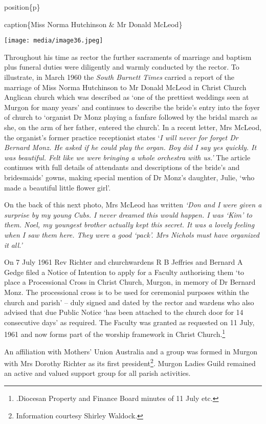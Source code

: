 position\{p\}

caption\{Miss Norma Hutchinson \& Mr Donald McLeod\}

\texttt{[image: media/image36.jpeg]}

Throughout his time as rector the further sacraments of marriage and baptism plus funeral duties were diligently and warmly conducted by the rector. To illustrate, in March 1960 the \emph{South Burnett Times} carried a report of the marriage of Miss Norma Hutchinson to Mr Donald McLeod in Christ Church Anglican church which was described as `one of the prettiest weddings seen at Murgon for many years' and continues to describe the bride's entry into the foyer of church to `organist Dr Monz playing a fanfare followed by the bridal march as she, on the arm of her father, entered the church'. In a recent letter, Mrs McLeod, the organist's former practice receptionist states `\emph{I will never for forget Dr Bernard Monz. He asked if he could play the organ. Boy did I say yes quickly. It was beautiful. Felt like we were bringing a whole orchestra with us.'} The article continues with full details of attendants and descriptions of the bride's and bridesmaids' gowns, making special mention of Dr Monz's daughter, Julie, `who made a beautiful little flower girl'.

On the back of this next photo, Mrs McLeod has written \emph{`Don and I were given a surprise by my young Cubs. I never dreamed this would happen. I was `Kim' to them. Noel, my youngest brother actually kept this secret. It was a lovely feeling when I saw them here. They were a good `pack'. Mrs Nichols must have organized it} \emph{all.'}

On 7 July 1961 Rev Richter and churchwardens R B Jeffries and Bernard A Gedge filed a Notice of Intention to apply for a Faculty authorising them `to place a Processional Cross in Christ Church, Murgon, in memory of Dr Bernard Monz. The processional cross is to be used for ceremonial purposes within the church and parish' -- duly signed and dated by the rector and wardens who also advised that due Public Notice `has been attached to the church door for 14 consecutive days' as required. The Faculty was granted as requested on 11 July, 1961 and now forms part of the worship framework in Christ Church.\footnote{.Diocesan Property and Finance Board minutes of 11 July etc.}

An affiliation with Mothers' Union Australia and a group was formed in Murgon with Mrs Dorothy Richter as its first president\footnote{Information courtesy Shirley Waldock.}. Murgon Ladies Guild remained an active and valued support group for all parish activities.

